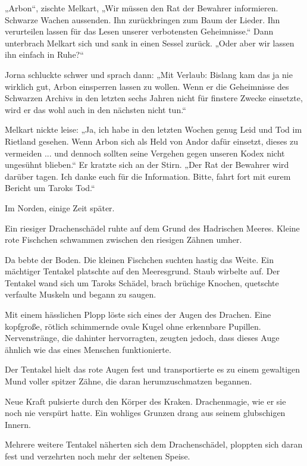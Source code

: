 „Arbon“, zischte Melkart, „Wir müssen den Rat der Bewahrer informieren. Schwarze Wachen aussenden. Ihn zurückbringen zum Baum der Lieder. Ihn verurteilen lassen für das Lesen unserer verbotensten Geheimnisse.“ Dann unterbrach Melkart sich und sank in einen Sessel zurück. „Oder aber wir lassen ihn einfach in Ruhe?“

Jorna schluckte schwer und sprach dann: „Mit Verlaub: Bislang kam das ja nie wirklich gut, Arbon einsperren lassen zu wollen. Wenn er die Geheimnisse des Schwarzen Archivs in den letzten sechs Jahren nicht für finstere Zwecke einsetzte, wird er das wohl auch in den nächsten nicht tun.“

Melkart nickte leise: „Ja, ich habe in den letzten Wochen genug Leid und Tod im Rietland gesehen. Wenn Arbon sich als Held von Andor dafür einsetzt, dieses zu vermeiden ... und dennoch sollten seine Vergehen gegen unseren Kodex nicht ungesühnt blieben.“ Er kratzte sich an der Stirn. „Der Rat der Bewahrer wird darüber tagen. Ich danke euch für die Information. Bitte, fahrt fort mit eurem Bericht um Taroks Tod.“\bigskip







Im Norden, einige Zeit später.\bigskip



Ein riesiger Drachenschädel ruhte auf dem Grund des Hadrischen Meeres. Kleine rote Fischchen schwammen zwischen den riesigen Zähnen umher.

Da bebte der Boden. Die kleinen Fischchen suchten hastig das Weite. Ein mächtiger Tentakel platschte auf den Meeresgrund. Staub wirbelte auf. Der Tentakel wand sich um Taroks Schädel, brach brüchige Knochen, quetschte verfaulte Muskeln und begann zu saugen.

Mit einem hässlichen Plopp löste sich eines der Augen des Drachen. Eine kopfgroße, rötlich schimmernde ovale Kugel ohne erkennbare Pupillen. Nervenstränge, die dahinter hervorragten, zeugten jedoch, dass dieses Auge ähnlich wie das eines Menschen funktionierte.

Der Tentakel hielt das rote Augen fest und transportierte es zu einem gewaltigen Mund voller spitzer Zähne, die daran herumzuschmatzen begannen.

Neue Kraft pulsierte durch den Körper des Kraken. Drachenmagie, wie er sie noch nie verspürt hatte. Ein wohliges Grunzen drang aus seinem glubschigen Innern.

Mehrere weitere Tentakel näherten sich dem Drachenschädel, ploppten sich daran fest und verzehrten noch mehr der seltenen Speise.

